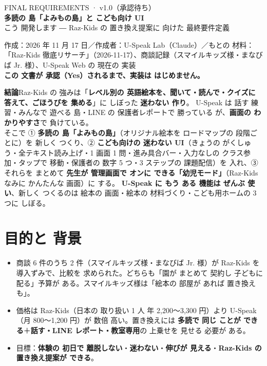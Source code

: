 \documentclass[a4paper,10pt]{article}
\begin{document}
\begin{tcolorbox}[enhanced,colback=deep,colframe=deep,arc=4pt,left=12pt,right=12pt,top=10pt,bottom=10pt]
{\color{white}\footnotesize FINAL REQUIREMENTS · v1.0（承認待ち）}\\[2pt]
{\color{white}\LARGE\bfseries 多読の 島「よみもの島」と こども向け UI}\\[3pt]
{\color{white}\normalsize こう 開発します ― Raz-Kids の 置き換え提案に 向けた 最終要件定義}
\end{tcolorbox}

{\footnotesize\color{soft}作成：2026 年 11 月 17 日／作成者：U-Speak Lab（Claude）／もとの 材料：「Raz-Kids 徹底リサーチ」（2026-11-17）、商談記録（スマイルキッズ様・まなびば Jr. 様）、U-Speak Web の 現在の 実装\\
\textbf{この 文書が 承認（Yes）されるまで、実装は はじめません。}}

\begin{summary}
\textbf{結論}\quad Raz-Kids の 強みは「\textbf{レベル別の 英語絵本を、聞いて・読んで・クイズに 答えて、ごほうびを 集める}」に しぼった \textbf{迷わない 作り}。
U-Speak は 話す 練習・みんなで 遊べる 島・LINE の 保護者レポートで 勝っている が、\textbf{画面の わかりやすさ}で 負けている。\\[3pt]
そこで ① \textbf{多読の 島「よみもの島」}（オリジナル絵本を ロードマップの 段階ごとに）を 新しく つくり、② \textbf{こども向けの 迷わない UI}（きょうの がくしゅう・全テキスト読み上げ・1 画面 1 問・進み具合バー・入力なしの クラス参加・タップで 移動・保護者の 数字 5 つ・3 ステップの 課題配信）を 入れ、③ それらを まとめて \textbf{先生が 管理画面で オンに できる「幼児モード」}（Raz-Kids なみに かんたんな 画面）に する。
\textbf{U-Speak に もう ある 機能は ぜんぶ 使い}、新しく つくるのは 絵本の 画面・絵本の 材料づくり・こども用ホームの 3 つに しぼる。
\end{summary}

\section{目的と 背景}
\begin{itemize}
\item 商談 6 件のうち 2 件（スマイルキッズ様・まなびば Jr. 様）が Raz-Kids を 導入ずみで、比較を 求められた。どちらも「園が まとめて 契約し 子どもに 配る」予算が ある。スマイルキッズ様は「絵本の 部屋が あれば 置き換えも」。
\item 価格は Raz-Kids（日本の 取り扱い 1 人 年 2,200〜3,300 円）より U-Speak（月 800〜1,200 円）が 数倍 高い。置き換えには \textbf{多読で 同じ ことが できる}＋\textbf{話す・LINE レポート・教室専用}の 上乗せを 見せる 必要が ある。
\item 目標：\textbf{体験の 初日で 離脱しない}・\textbf{迷わない}・\textbf{伸びが 見える}・\textbf{Raz-Kids の 置き換え提案が できる}。
\end{itemize}
\end{document}
